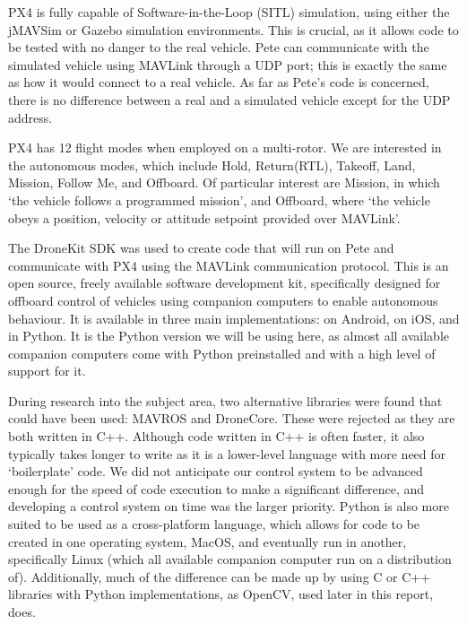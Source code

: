 \documentclass[11pt]{article}
\begin{document}
PX4 is fully capable of Software-in-the-Loop (SITL) simulation, using either the jMAVSim or Gazebo simulation environments\cite{PX4_dev_guide}. This is crucial, as it allows code to be tested with no danger to the real vehicle. Pete can communicate with the simulated vehicle using MAVLink through a UDP port; this is exactly the same as how it would connect to a real vehicle. As far as Pete's code is concerned, there is no difference between a real and a simulated vehicle except for the UDP address.


PX4 has 12 flight modes when employed on a multi-rotor. We are interested in the autonomous modes, which include Hold, Return(RTL), Takeoff, Land, Mission, Follow Me, and Offboard. Of particular interest are Mission, in which `the vehicle follows a programmed mission', and Offboard, where `the vehicle obeys a position, velocity or attitude setpoint provided over MAVLink'\cite{PX4_user_guide}.

The DroneKit SDK was used to create code that will run on Pete and communicate with PX4 using the MAVLink communication protocol. This is an open source, freely available software development kit, specifically designed for offboard control of vehicles using companion computers to enable autonomous behaviour. It is available in three main implementations: on Android, on iOS, and in Python. It is the Python version we will be using here, as almost all available companion computers come with Python preinstalled and with a high level of support for it.

During research into the subject area, two alternative libraries were found that could have been used: MAVROS and DroneCore. These were rejected as they are both written in C++. Although code written in C++ is often faster, it also typically takes longer to write as it is a lower-level language with more need for `boilerplate' code. We did not anticipate our control system to be advanced enough for the speed of code execution to make a significant difference, and developing a control system on time was the larger priority. Python is also more suited to be used as a cross-platform language, which allows for code to be created in one operating system, MacOS, and eventually run in another, specifically Linux (which all available companion computer run on a distribution of).
Additionally, much of the difference can be made up by using C or C++ libraries with Python implementations, as OpenCV, used later in this report, does.
\end{document}
